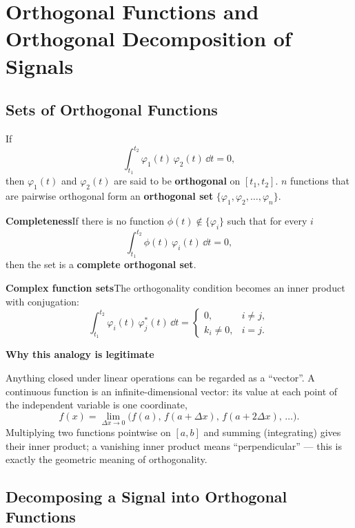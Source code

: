 \section{Orthogonal Functions and Orthogonal Decomposition of Signals}

\subsection{Sets of Orthogonal Functions}

\begin{definition*}
If
\[
    \int_{t_1}^{t_2}\varphi_1(t)\,\varphi_2(t)\,\dd t=0,
\]
then $\varphi_1(t)$ and $\varphi_2(t)$ are said to be \textbf{orthogonal} on
$[t_1,t_2]$. $n$ functions that are pairwise orthogonal form an
\textbf{orthogonal set} $\{\varphi_1,\varphi_2,\dots,\varphi_n\}$.
\end{definition*}

\textbf{Completeness}\quad If there is no function
$\phi(t)\notin\{\varphi_i\}$ such that for every $i$
\[
    \int_{t_1}^{t_2}\phi(t)\,\varphi_i(t)\,\dd t=0,
\]
then the set is a \textbf{complete orthogonal set}.

\textbf{Complex function sets}\quad The orthogonality condition becomes an
inner product with conjugation:
\[
    \int_{t_1}^{t_2}\varphi_i(t)\,\varphi_j^{*}(t)\,\dd t=
    \begin{cases}
        0, & i\neq j,\\[2pt]
        k_i\neq 0, & i=j .
    \end{cases}
\]

\begin{note}
\textbf{Why this analogy is legitimate}

Anything closed under linear operations can be regarded as a ``vector''. A
continuous function is an infinite-dimensional vector: its value at each point
of the independent variable is one coordinate,
\[
    f(x)=\lim_{\Delta x\to 0}\bigl(f(a),\,f(a+\Delta x),\,f(a+2\Delta x),\,\dots\bigr).
\]
Multiplying two functions pointwise on $[a,b]$ and summing (integrating) gives
their inner product; a vanishing inner product means ``perpendicular'' --- this
is exactly the geometric meaning of orthogonality.
\end{note}

\subsection{Decomposing a Signal into Orthogonal Functions}


